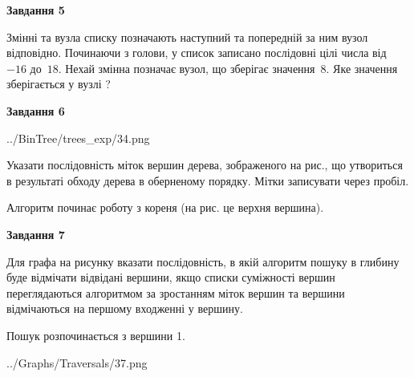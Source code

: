 \documentclass[12pt, ukrainian]{article}
\begin{document}
{\begin {large}
{\begin {center}\textbf{Завдання 5}\end {center}}\par
Змінні  та  вузла списку позначають наступний та попередній за ним вузол відповідно. Починаючи з голови, у список записано послідовні цілі числа від~$-16$ до~$18$. Нехай змінна  позначає вузол, що зберігає значення~$8$.
Яке значення зберігається у вузлі  ?\par
\newpage

{\begin {center}\textbf{Завдання 6}\end {center}}\par

\begin{center}
	{../BinTree/trees_exp/34.png}
\end{center}
Указати послідовність міток вершин дерева, зображеного на рис., що утвориться в результаті обходу дерева в оберненому порядку. Мітки записувати через пробіл.\par Алгоритм починає роботу з кореня (на рис. це верхня вершина).\par
\newpage

{\begin {center}\textbf{Завдання 7}\end {center}}\par
Для графа на рисунку вказати послідовність, в якій алгоритм пошуку в глибину буде відмічати відвідані вершини, якщо списки суміжності вершин переглядаються алгоритмом за зростанням міток вершин та вершини відмічаються на першому вход\-женні у вершину.\par
Пошук розпочинається з вершини 1.\par

\begin{center}
	{../Graphs/Traversals/37.png}
\end{center}\par
\newpage


\end{large}}
\end{document}
